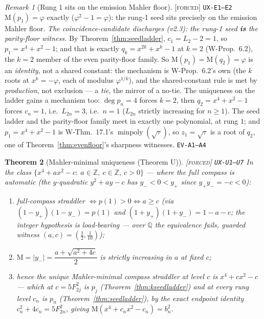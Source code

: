 \documentclass[11pt]{article}
\newcommand{\tagF}{\textcolor{cF}{\textsc{[forced]}}}
\newcommand{\hx}[1]{\textcolor{cC}{\footnotesize\texttt{#1}}}
\newcommand{\Q}{\mathbb{Q}}
\newcommand{\Z}{\mathbb{Z}}
\newcommand{\gp}{\varphi}
\newcommand{\M}{\mathrm{M}}
\theoremstyle{plain}
\newtheorem{theorem}{Theorem}[section]
\theoremstyle{definition}
\theoremstyle{remark}
\newtheorem{remark}[theorem]{Remark}
\begin{document}
\begin{remark}[Rung 1 sits on the emission Mahler floor]\label{rem:mahlerfloor}\tagF{} \hx{UX-E1--E2}
$\M(p_1)=\gp$ exactly ($\gp^2-1=\gp$): the rung-1 seed sits precisely on
the emission Mahler floor. \emph{The coincidence-candidate discharges (v2.3): the
rung-1 seed \textbf{is} the parity-floor witness.} By
Theorem~\ref{thm:seedladder}, $c_1=L_2-2=1$, so $p_1=x^4+x^2-1$; and that is
exactly $q_k=x^{2k}+x^k-1$ at $k=2$ (W-Prop.\ 6.2), the $k=2$ member of the even
parity-floor family. So $\M(p_1)=\M(q_2)=\gp$ is an \emph{identity}, not a shared
constant: the mechanism is W-Prop.\ 6.2's own (the $k$ roots at $x^k=-\gp$, each
of modulus $\gp^{1/k}$), and the shared-constant rule is met by \emph{production},
not exclusion --- a \emph{tie}, the mirror of a no-tie. The uniqueness on the
ladder gains a mechanism too: $\deg p_n=4$ forces $k=2$, then $q_2=x^4+x^2-1$
forces $c_n=1$, i.e.\ $L_{2n}=3$, i.e.\ $n=1$ ($L_{2n}$ strictly increasing for
$n\ge1$). The seed ladder and the parity-floor family meet in exactly one
polynomial, at rung $1$; and $p_1=x^4+x^2-1$ is W-Thm.\ 17.1's
$\operatorname{minpoly}(\sqrt\tau)$, so $z_1=\sqrt\tau$ is a root of $q_2$, one of
Theorem~\ref{thm:evenfloor}'s sharpness witnesses. \hx{EV-A1--A4}
\end{remark}

\begin{theorem}[Mahler-minimal uniqueness (Theorem U)]\label{thm:mahlermin}\tagF{} \hx{UX-U1--U7}
In the class $\{x^4+ax^2-c:\ a\in\Z,\ c\in\Z,\ c>0\}$ --- where the full
compass is automatic (the $y$-quadratic $y^2+ay-c$ has $y_-<0<y_+$ since
$y_+y_-=-c<0$):
\begin{enumerate}[nosep,label=(\roman*)]
\item full-compass straddler $\iff p(1)>0\iff a\ge c$ (via
$(1-y_+)(1-y_-)=p(1)$ and $(1+y_+)(1+y_-)=1-a-c$; the \emph{integer}
hypothesis is load-bearing --- over $\Q$ the equivalence fails, guarded
witness $(a,c)=(\tfrac12,\tfrac1{10})$);
\item $\M=|y_-|=\dfrac{a+\sqrt{a^2+4c}}2$ is strictly increasing in $a$ at
fixed $c$;
\item hence the \emph{unique} Mahler-minimal compass straddler at level $c$
is $x^4+cx^2-c$ --- which at $c=5F_{2j}^2$ is $p_j$
(Theorem~\ref{thm:kseedladder}) and at every rung level $c_n$ is $p_n$
(Theorem~\ref{thm:seedladder}), by the exact endpoint identity
$c_n^2+4c_n=5F_{2n}^2$, giving $\M(x^4+c_nx^2-c_n)=b_n^2$.
\end{enumerate}
\end{theorem}
\end{document}
